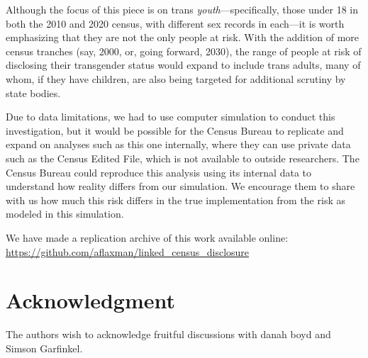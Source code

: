 \documentclass{jpc} %
\theoremstyle{plain}\newtheorem{satz}[thm]{Satz} %
\begin{document}
Although the focus of this piece is on trans \textit{youth}---specifically, those under 18 in both the 2010 and 2020 census, with different sex records in each---it is worth emphasizing that they are not the only people at risk. With the addition of more census tranches (say, 2000, or, going forward, 2030), the range of people at risk of disclosing their transgender status would expand to include trans adults, many of whom, if they have children, are also being targeted for additional scrutiny by state bodies.


Due to data limitations, we had to use computer simulation to conduct this investigation, but it would be possible for the Census Bureau to replicate and expand on analyses such as this one internally, where they can use private data such as the Census Edited File, which is not available to outside researchers.  The Census Bureau could reproduce this analysis using its internal data to understand how reality differs from our simulation. We encourage them to share with us how much this risk differs in the true implementation from the risk as modeled in this simulation.

We have made a replication archive of this work available online: \url{https://github.com/aflaxman/linked_census_disclosure}
 
\section*{Acknowledgment}
  \noindent The authors wish to acknowledge fruitful discussions with danah boyd and Simson Garfinkel.%




\end{document}

